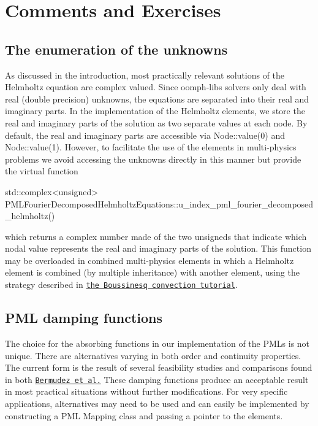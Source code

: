 \hypertarget{index_comments}{}\section{Comments and Exercises}\label{index_comments}
\hypertarget{index_unkns}{}\subsection{The enumeration of the unknowns}\label{index_unkns}
As discussed in the introduction, most practically relevant solutions of the Helmholtz equation are complex valued. Since {\ttfamily oomph-\/lib\textquotesingle{}s} solvers only deal with real (double precision) unknowns, the equations are separated into their real and imaginary parts. In the implementation of the Helmholtz elements, we store the real and imaginary parts of the solution as two separate values at each node. By default, the real and imaginary parts are accessible via {\ttfamily Node\+::value(0)} and {\ttfamily Node\+::value(1)}. However, to facilitate the use of the elements in multi-\/physics problems we avoid accessing the unknowns directly in this manner but provide the virtual function 
\begin{DoxyCode}
std::complex<unsigned> PMLFourierDecomposedHelmholtzEquations::u\_index\_pml\_fourier\_decomposed\_helmholtz()
\end{DoxyCode}
 which returns a complex number made of the two unsigneds that indicate which nodal value represents the real and imaginary parts of the solution. This function may be overloaded in combined multi-\/physics elements in which a Helmholtz element is combined (by multiple inheritance) with another element, using the strategy described in \href{../../../multi_physics/b_convection/html/index.html}{\tt the Boussinesq convection tutorial}.\hypertarget{index_dmp_fcts}{}\subsection{P\+M\+L damping functions}\label{index_dmp_fcts}
The choice for the absorbing functions in our implementation of the P\+M\+Ls is not unique. There are alternatives varying in both order and continuity properties. The current form is the result of several feasibility studies and comparisons found in both \href{http://www.sciencedirect.com/science/article/pii/S0021999106004487}{\tt Bermudez et al.} These damping functions produce an acceptable result in most practical situations without further modifications. For very specific applications, alternatives may need to be used and can easily be implemented by constructing a P\+ML Mapping class and passing a pointer to the elements.



